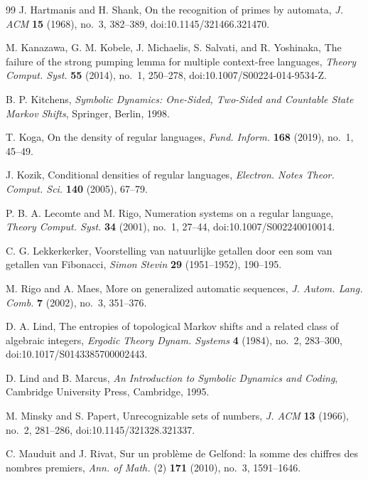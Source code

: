 \begin{thebibliography}{99}
J. Hartmanis and H. Shank,
On the recognition of primes by automata,
\textit{J. ACM} \textbf{15} (1968), no.~3, 382--389,
doi:10.1145/321466.321470.

M. Kanazawa, G. M. Kobele, J. Michaelis, S. Salvati, and R. Yoshinaka,
The failure of the strong pumping lemma for multiple context-free
languages,
\textit{Theory Comput. Syst.} \textbf{55} (2014), no.~1, 250--278,
doi:10.1007/S00224-014-9534-Z.

B. P. Kitchens,
\textit{Symbolic Dynamics: One-Sided, Two-Sided and Countable State
Markov Shifts},
Springer, Berlin, 1998.

T. Koga,
On the density of regular languages,
\textit{Fund. Inform.} \textbf{168} (2019), no.~1, 45--49.

J. Kozik,
Conditional densities of regular languages,
\textit{Electron. Notes Theor. Comput. Sci.} \textbf{140} (2005), 67--79.

P. B. A. Lecomte and M. Rigo,
Numeration systems on a regular language,
\textit{Theory Comput. Syst.} \textbf{34} (2001), no.~1, 27--44,
doi:10.1007/S002240010014.

C. G. Lekkerkerker,
Voorstelling van natuurlijke getallen door een som van getallen van
Fibonacci,
\textit{Simon Stevin} \textbf{29} (1951--1952), 190--195.

M. Rigo and A. Maes,
More on generalized automatic sequences,
\textit{J. Autom. Lang. Comb.} \textbf{7} (2002), no.~3, 351--376.

D. A. Lind,
The entropies of topological Markov shifts and a related class of algebraic
integers,
\textit{Ergodic Theory Dynam. Systems} \textbf{4} (1984), no.~2, 283--300,
doi:10.1017/S0143385700002443.

D. Lind and B. Marcus,
\textit{An Introduction to Symbolic Dynamics and Coding},
Cambridge University Press, Cambridge, 1995.

M. Minsky and S. Papert,
Unrecognizable sets of numbers,
\textit{J. ACM} \textbf{13} (1966), no.~2, 281--286,
doi:10.1145/321328.321337.

C. Mauduit and J. Rivat,
Sur un probl{\`e}me de Gelfond: la somme des chiffres des nombres
premiers,
\textit{Ann. of Math.} (2) \textbf{171} (2010), no.~3, 1591--1646.


\end{thebibliography}
